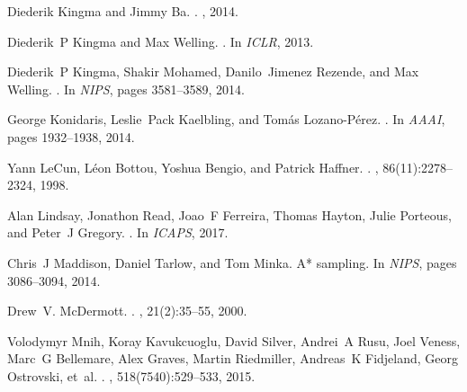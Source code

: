 \documentclass[11pt]{article}
\begin{document}
\begin{thebibliography}{}
Diederik Kingma and Jimmy Ba.
.
, 2014.

Diederik~P Kingma and Max Welling.
.
\newblock In {\em {ICLR}}, 2013.

Diederik~P Kingma, Shakir Mohamed, Danilo~Jimenez Rezende, and Max Welling.
.
\newblock In {\em {NIPS}}, pages 3581--3589, 2014.

George Konidaris, Leslie~Pack Kaelbling, and Tom{\'a}s Lozano{-}P{\'e}rez.
.
\newblock In {\em {AAAI}}, pages 1932--1938, 2014.

Yann LeCun, L{\'e}on Bottou, Yoshua Bengio, and Patrick Haffner.
.
, 86(11):2278--2324, 1998.

Alan Lindsay, Jonathon Read, Joao~F Ferreira, Thomas Hayton, Julie Porteous,
  and Peter~J Gregory.
.
\newblock In {\em {ICAPS}}, 2017.

Chris~J Maddison, Daniel Tarlow, and Tom Minka.
\newblock A* sampling.
\newblock In {\em {NIPS}}, pages 3086--3094, 2014.

Drew~V. McDermott.
.
, 21(2):35--55, 2000.

Volodymyr Mnih, Koray Kavukcuoglu, David Silver, Andrei~A Rusu, Joel Veness,
  Marc~G Bellemare, Alex Graves, Martin Riedmiller, Andreas~K Fidjeland, Georg
  Ostrovski, et~al.
.
, 518(7540):529--533, 2015.


\end{thebibliography}
\end{document}
